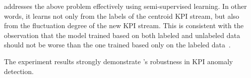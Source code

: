 \name{} addresses the above problem effectively using semi-supervised learning. 
In other words, it learns not only from the labels of the centroid KPI stream, but also from the fluctuation degree of the new KPI stream.
This is consistent with the observation that the model trained based on both labeled and unlabeled data should not be worse than the one trained based only on the labeled data~\cite{loog2016contrastive}.

The experiment results strongly demonstrate \name{}'s robustness in KPI anomaly detection.






